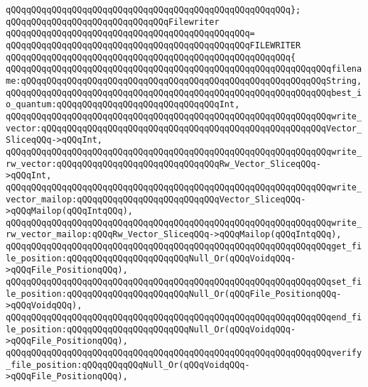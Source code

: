 \verb|qQQqqQQqqQQqqQQqqQQqqQQqqQQqqQQqqQQqqQQqqQQqqQQqqQQqqQQq};|\newline
\newline
\verb|qQQqqQQqqQQqqQQqqQQqqQQqqQQqqQQqFilewriter|\newline
\verb|qQQqqQQqqQQqqQQqqQQqqQQqqQQqqQQqqQQqqQQqqQQqqQQq=|\newline
\verb|qQQqqQQqqQQqqQQqqQQqqQQqqQQqqQQqqQQqqQQqqQQqqQQqFILEWRITER|\newline
\verb|qQQqqQQqqQQqqQQqqQQqqQQqqQQqqQQqqQQqqQQqqQQqqQQqqQQqqQQq{|\newline
\verb|qQQqqQQqqQQqqQQqqQQqqQQqqQQqqQQqqQQqqQQqqQQqqQQqqQQqqQQqqQQqqQQqfilename:qQQqqQQqqQQqqQQqqQQqqQQqqQQqqQQqqQQqqQQqqQQqqQQqqQQqqQQqqQQqString,|\newline
\verb|qQQqqQQqqQQqqQQqqQQqqQQqqQQqqQQqqQQqqQQqqQQqqQQqqQQqqQQqqQQqqQQqbest_io_quantum:qQQqqQQqqQQqqQQqqQQqqQQqqQQqqQQqInt,|\newline
\newline
\verb|qQQqqQQqqQQqqQQqqQQqqQQqqQQqqQQqqQQqqQQqqQQqqQQqqQQqqQQqqQQqqQQqwrite_vector:qQQqqQQqqQQqqQQqqQQqqQQqqQQqqQQqqQQqqQQqqQQqqQQqqQQqqQQqVector_SliceqQQq->qQQqInt,|\newline
\verb|qQQqqQQqqQQqqQQqqQQqqQQqqQQqqQQqqQQqqQQqqQQqqQQqqQQqqQQqqQQqqQQqwrite_rw_vector:qQQqqQQqqQQqqQQqqQQqqQQqqQQqqQQqRw_Vector_SliceqQQq->qQQqInt,|\newline
\newline
\verb|qQQqqQQqqQQqqQQqqQQqqQQqqQQqqQQqqQQqqQQqqQQqqQQqqQQqqQQqqQQqqQQqwrite_vector_mailop:qQQqqQQqqQQqqQQqqQQqqQQqqQQqVector_SliceqQQq->qQQqMailop(qQQqIntqQQq),|\newline
\verb|qQQqqQQqqQQqqQQqqQQqqQQqqQQqqQQqqQQqqQQqqQQqqQQqqQQqqQQqqQQqqQQqwrite_rw_vector_mailop:qQQqRw_Vector_SliceqQQq->qQQqMailop(qQQqIntqQQq),|\newline
\newline
\verb|qQQqqQQqqQQqqQQqqQQqqQQqqQQqqQQqqQQqqQQqqQQqqQQqqQQqqQQqqQQqqQQqget_file_position:qQQqqQQqqQQqqQQqqQQqqQQqNull_Or(qQQqVoidqQQq->qQQqFile_PositionqQQq),|\newline
\verb|qQQqqQQqqQQqqQQqqQQqqQQqqQQqqQQqqQQqqQQqqQQqqQQqqQQqqQQqqQQqqQQqset_file_position:qQQqqQQqqQQqqQQqqQQqqQQqNull_Or(qQQqFile_PositionqQQq->qQQqVoidqQQq),|\newline
\newline
\verb|qQQqqQQqqQQqqQQqqQQqqQQqqQQqqQQqqQQqqQQqqQQqqQQqqQQqqQQqqQQqqQQqend_file_position:qQQqqQQqqQQqqQQqqQQqqQQqNull_Or(qQQqVoidqQQq->qQQqFile_PositionqQQq),|\newline
\verb|qQQqqQQqqQQqqQQqqQQqqQQqqQQqqQQqqQQqqQQqqQQqqQQqqQQqqQQqqQQqqQQqverify_file_position:qQQqqQQqqQQqNull_Or(qQQqVoidqQQq->qQQqFile_PositionqQQq),|\newline
